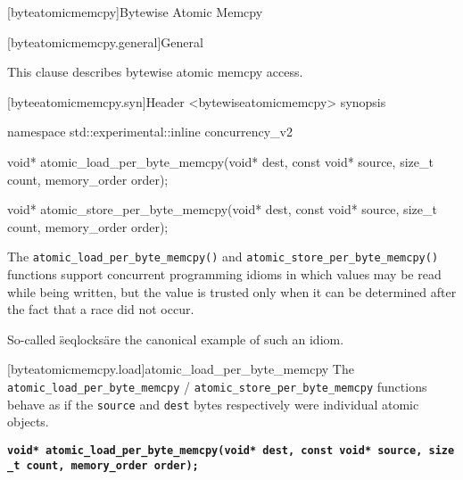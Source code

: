 
[byteatomicmemcpy]{Bytewise Atomic Memcpy}

[byteatomicmemcpy.general]{General}

This clause describes bytewise atomic memcpy access. 


[byteeatomicmemcpy.syn]{Header <bytewiseatomicmemcpy> synopsis}

\begin{codeblock}
namespace std::experimental::inline concurrency_v2 {

  void* atomic_load_per_byte_memcpy(void* dest, const void* source, size_t count, memory_order order);

  void* atomic_store_per_byte_memcpy(void* dest, const void* source, size_t count, memory_order order);


}
\end{codeblock}

\pnum

The \texttt{atomic\_load\_per\_byte\_memcpy()} and
\texttt{atomic\_store\_per\_byte\_memcpy()} functions support concurrent
programming idioms in which values may be read while being written, but
the value is trusted only when it can be determined after the fact that
a race did not occur. \begin{note} So-called \"seqlocks\" are the canonical
example of such an idiom. \end{note}


[byteatomicmemcpy.load]{atomic_load_per_byte_memcpy}
\pnum
The \texttt{atomic\_load\_per\_byte\_memcpy} /
\texttt{atomic\_store\_per\_byte\_memcpy} functions behave as if the
\texttt{source} and \texttt{dest} bytes respectively were individual
atomic objects.

\textbf{\texttt{void*\ atomic\_load\_per\_byte\_memcpy(void*\ dest,\ const\ void*\ source,\ size\_t\ count,\ memory\_order\ order);}}

